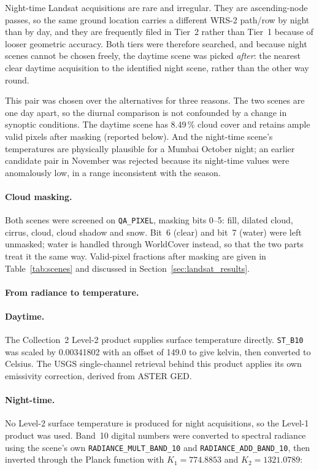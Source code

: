 \documentclass[11pt,a4paper]{article}
\begin{document}
Night-time Landsat acquisitions are rare and irregular. They are
ascending-node passes, so the same ground location carries a different
WRS-2 path/row by night than by day, and they are frequently filed in
Tier~2 rather than Tier~1 because of looser geometric accuracy. Both
tiers were therefore searched, and because night scenes cannot be
chosen freely, the daytime scene was picked \emph{after}: the
nearest clear daytime acquisition to the identified night scene,
rather than the other way round.

This pair was chosen over the alternatives for three reasons. The two
scenes are one day apart, so the diurnal comparison is not confounded
by a change in synoptic conditions. The daytime scene has 8.49\,\%
cloud cover and retains ample valid pixels after masking (reported
below). And the night-time scene's temperatures are physically
plausible for a Mumbai October night; an earlier candidate pair in
November was rejected because its night-time values were anomalously
low, in a range inconsistent with the season.

\paragraph{Cloud masking.}

Both scenes were screened on \texttt{QA\_PIXEL}, masking bits 0--5:
fill, dilated cloud, cirrus, cloud, cloud shadow and snow. Bit~6
(clear) and bit~7 (water) were left unmasked; water is handled
through WorldCover instead, so that the two parts treat it the same
way. Valid-pixel fractions after masking are given in
Table~\ref{tab:scenes} and discussed in Section~\ref{sec:landsat_results}.

\paragraph{From radiance to temperature.}

\paragraph{Daytime.} The Collection~2 Level-2 product supplies surface
temperature directly. \texttt{ST\_B10} was scaled by \num{0.00341802}
with an offset of \num{149.0} to give kelvin, then converted to
Celsius. The USGS single-channel retrieval behind this product applies
its own emissivity correction, derived from ASTER GED.

\paragraph{Night-time.} No Level-2 surface temperature is produced for
night acquisitions, so the Level-1 product was used. Band~10 digital
numbers were converted to spectral radiance using the scene's own
\texttt{RADIANCE\_MULT\_BAND\_10} and \texttt{RADIANCE\_ADD\_BAND\_10},
then inverted through the Planck function with
$K_1 = \num{774.8853}$ and $K_2 = \num{1321.0789}$:
\end{document}
